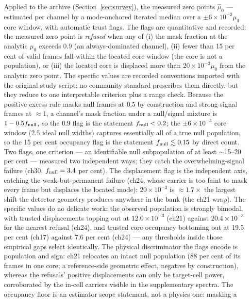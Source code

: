 Applied to the archive (Section~\ref{sec:survey}), the measured zero
points $\hat\mu_0$ --- estimated per channel by a mode-anchored iterated
median over a $\pm 6\times 10^{-3}\mu_0$ core window, with automatic trust
flags. The flags are quantitative and recorded: the measured zero point
is \emph{refused} when any of (i) the mask fraction at the analytic
$\mu_0$ exceeds 0.9 (an always-dominated channel), (ii) fewer than 15
per cent of valid frames fall within the located core window (the core
is not a population), or (iii) the located core is displaced more than
$20\times10^{-3}\mu_0$ from the analytic zero point. The specific
values are recorded conventions imported with the original study
script; no community standard prescribes them directly, but they
reduce to one interpretable criterion plus a range check. Because the
positive-excess rule masks null frames at 0.5 by construction and
strong-signal frames at $\approx 1$, a channel's mask fraction under
a null/signal mixture is $1 - 0.5 f_{\rm null}$, so the 0.9 flag is
the statement $f_{\rm null} < 0.2$; the $\pm 6\times10^{-3}$ core
window (2.5 ideal null widths) captures essentially all of a true null
population, so the 15 per cent occupancy flag is the statement
$f_{\rm null} \lesssim 0.15$ by direct count. Two flags, one
criterion --- an identifiable null subpopulation of at least
$\sim$15--20 per cent --- measured two independent ways; they catch
the overwhelming-signal failure (ch30, $f_{\rm null} = 3.4$ per
cent). The displacement flag is the independent axis, catching the
weak-but-permanent failure (ch24, whose carrier is too faint to mask
every frame but displaces the located mode): $20\times10^{-3}$ is
$\approx 1.7\times$ the
largest shift the detector geometry produces anywhere in the bank (the
ch21 wrap). The specific values do no delicate work: the observed population is strongly bimodal, with
trusted displacements topping out at $12.0\times10^{-3}$ (ch21)
against $20.4\times10^{-3}$ for the nearest refusal (ch24), and
trusted core occupancy bottoming out at 19.5 per cent (ch17) against
7.6 per cent (ch24) --- any thresholds inside those empirical gaps
select identically. The physical discriminator the flags encode is
population and sign: ch21 relocates an intact null population (88 per
cent of its frames in one core; a reference-side geometric effect,
negative by construction), whereas the refusals' positive
displacements can only be target-cell power, corroborated by the
in-cell carriers visible in the supplementary spectra. The occupancy
floor is an estimator-scope statement, not a physics one: masking a
